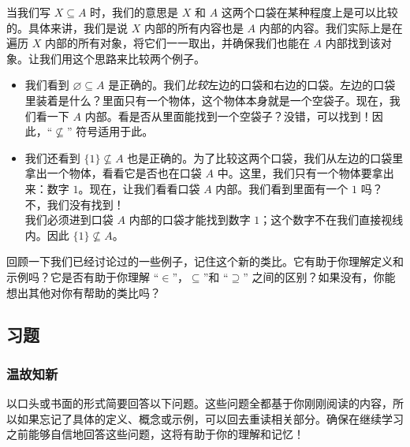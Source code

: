 当我们写 $X \subseteq A$ 时，我们的意思是 $X$ 和 $A$ 这两个口袋在某种程度上是可以比较的。具体来讲，我们是说 $X$ 内部的所有内容也是 $A$ 内部的内容。我们实际上是在遍历 $X$ 内部的所有对象，将它们一一取出，并确保我们也能在 $A$ 内部找到该对象。让我们用这个思路来比较两个例子。

\begin{itemize}
    \item 我们看到 ${\varnothing} \subseteq A$ 是正确的。我们\emph{比较}左边的口袋和右边的口袋。左边的口袋里装着是什么？里面只有一个物体，这个物体本身就是一个空袋子。现在，我们看一下 $A$ 内部。看是否从里面能找到一个空袋子？没错，可以找到！因此，``$\nsubseteq$'' 符号适用于此。
    \item 我们还看到 $\{1\} \nsubseteq A$ 也是正确的。为了比较这两个口袋，我们从左边的口袋里拿出一个物体，看看它是否也在口袋 $A$ 中。这里，我们只有一个物体要拿出来：数字 $1$。现在，让我们看看口袋 $A$ 内部。我们看到里面有一个 $1$ 吗？ 不，我们没有找到！\\
    我们必须进到口袋 $A$ 内部的口袋才能找到数字 $1$；这个数字不在我们直接视线内。因此 $\{1\} \nsubseteq A$。
\end{itemize}

回顾一下我们已经讨论过的一些例子，记住这个新的类比。它有助于你理解定义和示例吗？它是否有助于你理解 ``$\in$''，$\subseteq$''和 ``$\supseteq$'' 之间的区别？如果没有，你能想出其他对你有帮助的类比吗？

\subsection{习题}

\subsubsection*{温故知新}

以口头或书面的形式简要回答以下问题。这些问题全都基于你刚刚阅读的内容，所以如果忘记了具体的定义、概念或示例，可以回去重读相关部分。确保在继续学习之前能够自信地回答这些问题，这将有助于你的理解和记忆！

